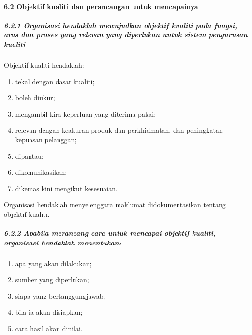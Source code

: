 \documentclass[
]{article}
\begin{document}
\hypertarget{objektif-kualiti-dan-perancangan-untuk-mencapainya}{%
\paragraph{6.2 Objektif kualiti dan perancangan untuk
mencapainya}\label{objektif-kualiti-dan-perancangan-untuk-mencapainya}}

\hypertarget{organisasi-hendaklah-mewujudkan-objektif-kualiti-pada-fungsi-aras-dan-proses-yang-relevan-yang-diperlukan-untuk-sistem-pengurusan-kualiti}{%
\subparagraph{6.2.1 Organisasi hendaklah mewujudkan objektif kualiti
pada fungsi, aras dan proses yang relevan yang diperlukan untuk sistem
pengurusan
kualiti}\label{organisasi-hendaklah-mewujudkan-objektif-kualiti-pada-fungsi-aras-dan-proses-yang-relevan-yang-diperlukan-untuk-sistem-pengurusan-kualiti}}

Objektif kualiti hendaklah:

\begin{enumerate}
\def\labelenumi{\alph{enumi})}
\item
  tekal dengan dasar kualiti;
\item
  boleh diukur;
\item
  mengambil kira keperluan yang diterima pakai;
\item
  relevan dengan keakuran produk dan perkhidmatan, dan peningkatan
  kepuasan pelanggan;
\item
  dipantau;
\item
  dikomunikasikan;
\item
  dikemas kini mengikut kesesuaian.
\end{enumerate}

Organisasi hendaklah menyelenggara maklumat didokumentasikan tentang
objektif kualiti.

\hypertarget{apabila-merancang-cara-untuk-mencapai-objektif-kualiti-organisasi-hendaklah-menentukan}{%
\subparagraph{6.2.2 Apabila merancang cara untuk mencapai objektif
kualiti, organisasi hendaklah
menentukan:}\label{apabila-merancang-cara-untuk-mencapai-objektif-kualiti-organisasi-hendaklah-menentukan}}

\begin{enumerate}
\def\labelenumi{\alph{enumi})}
\item
  apa yang akan dilakukan;
\item
  sumber yang diperlukan;
\item
  siapa yang bertanggungjawab;
\item
  bila ia akan disiapkan;
\item
  cara hasil akan dinilai.
\end{enumerate}
\end{document}
